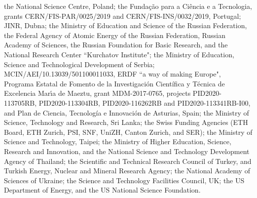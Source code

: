 \documentclass[11pt,twoside,a4paper]{cms-tdr}
\begin{document}
\begin{itemize}
the National Science Centre, Poland; the Funda\c{c}\~ao para a Ci\^encia e a Tecnologia, grants CERN/FIS-PAR/0025/2019 and CERN/FIS-INS/0032/2019, Portugal; JINR, Dubna; the Ministry of Education and Science of the Russian Federation, the Federal Agency of Atomic Energy of the Russian Federation, Russian Academy of Sciences, the Russian Foundation for Basic Research, and the National Research Center ``Kurchatov Institute"; the Ministry of Education, Science and Technological Development of Serbia; MCIN/AEI/10.13039/501100011033, ERDF ``a way of making Europe", Programa Estatal de Fomento de la Investigaci{\'o}n Cient{\'i}fica y T{\'e}cnica de Excelencia Mar\'{\i}a de Maeztu, grant MDM-2017-0765, projects PID2020-113705RB, PID2020-113304RB, PID2020-116262RB and PID2020-113341RB-I00, and Plan de Ciencia, Tecnolog{\'i}a e Innovaci{\'o}n de Asturias, Spain; the Ministry of Science, Technology and Research, Sri Lanka; the Swiss Funding Agencies (ETH Board, ETH Zurich, PSI, SNF, UniZH, Canton Zurich, and SER); the Ministry of Science and Technology, Taipei; the Ministry of Higher Education, Science, Research and Innovation, and the National Science and Technology Development Agency of Thailand; the Scientific and Technical Research Council of Turkey, and Turkish Energy, Nuclear and Mineral Research Agency; the National Academy of Sciences of Ukraine; the Science and Technology Facilities Council, UK; the US Department of Energy, and the US National Science Foundation.


\end{itemize}
\end{document}

